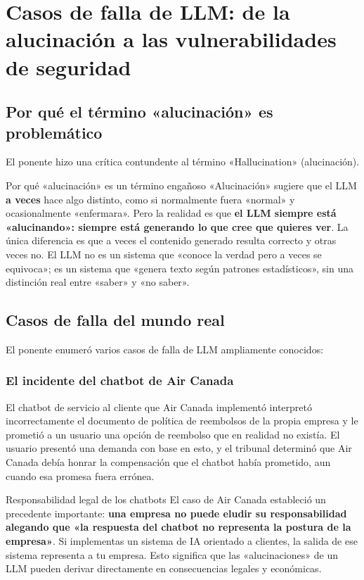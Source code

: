 \section{Casos de falla de LLM: de la alucinación a las vulnerabilidades de seguridad}

\subsection{Por qué el término «alucinación» es problemático}

El ponente hizo una crítica contundente al término «Hallucination» (alucinación).

\begin{importantbox}{Por qué «alucinación» es un término engañoso}
«Alucinación» sugiere que el LLM \textbf{a veces} hace algo distinto, como si normalmente fuera «normal» y ocasionalmente «enfermara». Pero la realidad es que \textbf{el LLM siempre está «alucinando»: siempre está generando lo que cree que quieres ver}. La única diferencia es que a veces el contenido generado resulta correcto y otras veces no. El LLM no es un sistema que «conoce la verdad pero a veces se equivoca»; es un sistema que «genera texto según patrones estadísticos», sin una distinción real entre «saber» y «no saber».
\end{importantbox}

\subsection{Casos de falla del mundo real}

El ponente enumeró varios casos de falla de LLM ampliamente conocidos:

\subsubsection{El incidente del chatbot de Air Canada}

El chatbot de servicio al cliente que Air Canada implementó interpretó incorrectamente el documento de política de reembolsos de la propia empresa y le prometió a un usuario una opción de reembolso que en realidad no existía. El usuario presentó una demanda con base en esto, y el tribunal determinó que Air Canada debía honrar la compensación que el chatbot había prometido, aun cuando esa promesa fuera errónea.

\begin{warningbox}{Responsabilidad legal de los chatbots}
El caso de Air Canada estableció un precedente importante: \textbf{una empresa no puede eludir su responsabilidad alegando que «la respuesta del chatbot no representa la postura de la empresa»}. Si implementas un sistema de IA orientado a clientes, la salida de ese sistema representa a tu empresa. Esto significa que las «alucinaciones» de un LLM pueden derivar directamente en consecuencias legales y económicas.
\end{warningbox}

